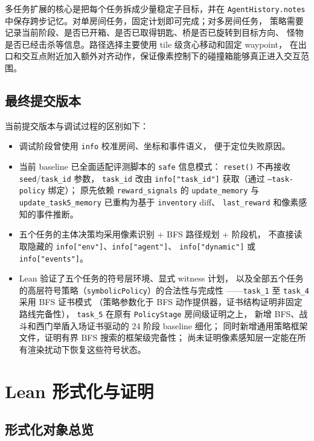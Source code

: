 \documentclass[12pt,a4paper]{ctexart}
\begin{document}
多任务扩展的核心是把每个任务拆成少量稳定子目标，并在 \texttt{AgentHistory.notes}
中保存跨步记忆。对单房间任务，固定计划即可完成；对多房间任务，
策略需要记录当前阶段、是否已开箱、是否已取得钥匙、桥是否已旋转到目标方向、
怪物是否已经击杀等信息。路径选择主要使用 tile 级贪心移动和固定 waypoint，
在出口和交互点附近加入额外对齐动作，保证像素控制下的碰撞箱能够真正进入交互范围。

\subsection{最终提交版本}

当前提交版本与调试过程的区别如下：
\begin{itemize}[leftmargin=2em]
  \item 调试阶段曾使用 \texttt{info} 校准房间、坐标和事件语义，
  便于定位失败原因。
  \item 当前 baseline 已全面适配评测脚本的 \texttt{safe} 信息模式：
  \texttt{reset()} 不再接收 \texttt{seed}/\texttt{task\_id} 参数，
  \texttt{task\_id} 改由 \texttt{info["task\_id"]} 获取（通过 \texttt{--task-policy} 绑定）；
  原先依赖 \texttt{reward\_signals} 的 \texttt{update\_memory} 与
  \texttt{update\_task5\_memory} 已重构为基于 \texttt{inventory} diff、
  \texttt{last\_reward} 和像素感知的事件推断。
  \item 五个任务的主体决策均采用像素识别 + BFS 路径规划 + 阶段机，
  不直接读取隐藏的 \texttt{info["env"]}、\texttt{info["agent"]}、
  \texttt{info["dynamic"]} 或 \texttt{info["events"]}。
  \item Lean 验证了五个任务的符号层环境、显式 witness 计划，
  以及全部五个任务的高层符号策略（\texttt{symbolicPolicy}）的合法性与完成性
  ——\texttt{task\_1} 至 \texttt{task\_4} 采用 BFS 证书模式
  （策略参数化于 BFS 动作提供器，证书结构证明非固定路线完备性），
  \texttt{task\_5} 在原有 \texttt{PolicyStage} 房间级证明之上，
  新增 BFS、战斗和西门举盾入场证书驱动的 24 阶段 baseline 细化；
  同时新增通用策略框架文件，证明有界 BFS 搜索的框架级完备性；
  尚未证明像素感知层一定能在所有渲染扰动下恢复这些符号状态。
\end{itemize}

\section{Lean 形式化与证明}

\subsection{形式化对象总览}
\end{document}
